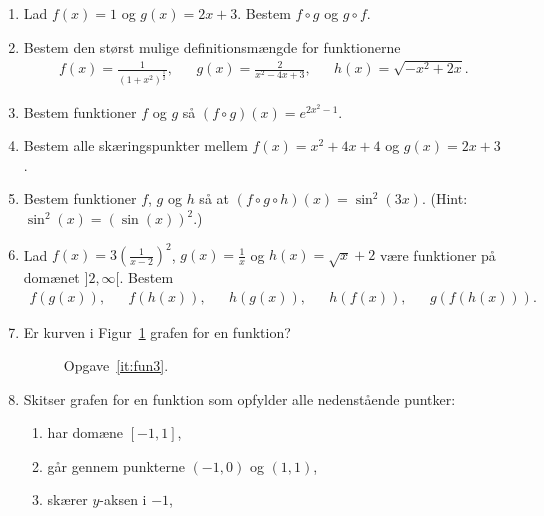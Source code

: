 \begin{enumerate}
		\item Lad $f(x)=1$ og $g(x)=2x+3$. Bestem $f\circ g$ og $g\circ f$.
	
		
	\item Bestem den størst mulige definitionsmængde for funktionerne
	\begin{align*}
	f(x)=\frac{1}{(1+x^2)^\frac{1}{2}},&& g(x)=\frac{2}{x^2-4x+3},&& h(x)=\sqrt{-x^2+2x}.
	\end{align*}
	


	\item Bestem funktioner $f$ og $g$ så $(f\circ g)(x)=e^{2x^2-1}$.
	
	\item Bestem alle skæringspunkter mellem $f(x)=x^2+4x+4$ og $g(x)=2x+3$.
	
	\item Bestem funktioner $f$, $g$ og $h$ så at $(f\circ g\circ h)(x)=\sin^2(3x)$. (Hint: $ \sin^2(x)=(\sin(x))^2 $.)
	
	\item Lad $f(x)=3(\frac{1}{x-2})^2$, $g(x)=\frac{1}{x}$ og $h(x)=\sqrt{x}+2$ være funktioner på domænet $]2,\infty[$. Bestem
	\begin{align*}
	f(g(x)),&& f(h(x)),&& h(g(x)),&& h(f(x)),&&g(f(h(x))).
	\end{align*} 
	
		\item\label{it:fun3} Er kurven i Figur~\ref{fig:fun3} grafen for en funktion?
	\begin{figure}
		\centering
		\caption{Opgave~\ref{it:fun3}.}
		\label{fig:fun3}
	\end{figure}
	
	
		
	\item Skitser grafen for en funktion som opfylder alle nedenstående puntker:
	\begin{enumerate}
		\item har domæne $[-1,1]$,
		\item går gennem punkterne $(-1,0)$ og $(1,1)$,
		\item skærer $y$-aksen i $-1$,
	\end{enumerate}
	
\end{enumerate}
